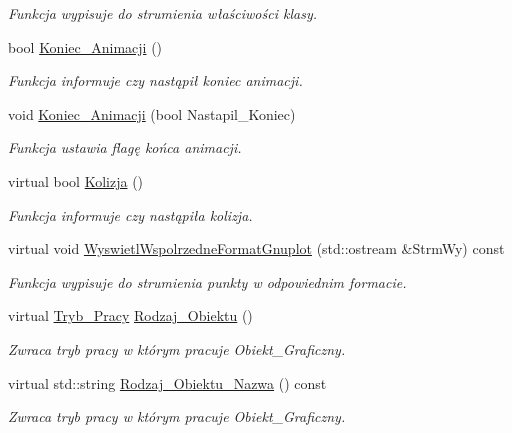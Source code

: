 \begin{DoxyCompactItemize}
\begin{DoxyCompactList}\small\item\em Funkcja wypisuje do strumienia właściwości klasy. \end{DoxyCompactList}\item 
bool \hyperlink{class_objekt___graficzny_ac3028c59aa6332787b63e0f79fa69d52}{Koniec\+\_\+\+Animacji} ()
\begin{DoxyCompactList}\small\item\em Funkcja informuje czy nastąpił koniec animacji. \end{DoxyCompactList}\item 
void \hyperlink{class_objekt___graficzny_ae830af8c088c3f056a29b85eb62ca482}{Koniec\+\_\+\+Animacji} (bool Nastapil\+\_\+\+Koniec)
\begin{DoxyCompactList}\small\item\em Funkcja ustawia flagę końca animacji. \end{DoxyCompactList}\item 
virtual bool \hyperlink{class_objekt___graficzny_a90300b4487267d5a3ae0e4b8a6ab29bc}{Kolizja} ()
\begin{DoxyCompactList}\small\item\em Funkcja informuje czy nastąpiła kolizja. \end{DoxyCompactList}\item 
\hypertarget{class_objekt___graficzny_ac6c74e172b8d7b1af225d9d715aa2adb}{virtual void \hyperlink{class_objekt___graficzny_ac6c74e172b8d7b1af225d9d715aa2adb}{Wyswietl\+Wspolrzedne\+Format\+Gnuplot} (std\+::ostream \&Strm\+Wy) const }\label{class_objekt___graficzny_ac6c74e172b8d7b1af225d9d715aa2adb}

\begin{DoxyCompactList}\small\item\em Funkcja wypisuje do strumienia punkty w odpowiednim formacie. \end{DoxyCompactList}\item 
\hypertarget{class_objekt___graficzny_a4c6d923812b319e2907ec7a2db71feb1}{virtual \hyperlink{_objekt___graficzny_8hh_a59b4a471a7481f2a0551d90a8a745c9f}{Tryb\+\_\+\+Pracy} \hyperlink{class_objekt___graficzny_a4c6d923812b319e2907ec7a2db71feb1}{Rodzaj\+\_\+\+Obiektu} ()}\label{class_objekt___graficzny_a4c6d923812b319e2907ec7a2db71feb1}

\begin{DoxyCompactList}\small\item\em Zwraca tryb pracy w którym pracuje Obiekt\+\_\+\+Graficzny. \end{DoxyCompactList}\item 
\hypertarget{class_objekt___graficzny_a772090d97002afb5abcdbd6e1883e77b}{virtual std\+::string \hyperlink{class_objekt___graficzny_a772090d97002afb5abcdbd6e1883e77b}{Rodzaj\+\_\+\+Obiektu\+\_\+\+Nazwa} () const }\label{class_objekt___graficzny_a772090d97002afb5abcdbd6e1883e77b}

\begin{DoxyCompactList}\small\item\em Zwraca tryb pracy w którym pracuje Obiekt\+\_\+\+Graficzny. \end{DoxyCompactList}\end{DoxyCompactItemize}
